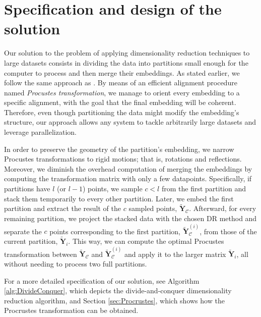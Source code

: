 \section{Specification and design of the solution}
\label{sec:specification-and-design-of-the-solution}

Our solution to the problem of applying dimensionality reduction techniques to large datasets consists in dividing the data into partitions small enough for the computer to process and then merge their embeddings. As stated earlier, we follow the same approach as \citet{Delicado2024}. By means of an efficient alignment procedure named \textit{Procustes transformation}, we manage to orient every embedding to a specific alignment, with the goal that the final embedding will be coherent. Therefore, even though partitioning the data might modify the embedding's structure, our approach allows any system to tackle arbitrarily large datasets and leverage parallelization.

In order to preserve the geometry of the partition's embedding, we narrow Procustes transformations to rigid motions; that is, rotations and reflections. Moreover, we diminish the overhead computation of merging the embeddings by computing the transformation matrix with only a few datapoints. Specifically, if partitions have $l$ (or $l-1$) points, we sample $c < l$ from the first partition and stack them temporarily to every other partition. Later, we embed the first partition and extract the result of the $c$ sampled points, $\mathbf{\tilde{Y}}_{\mathcal{C}}$. Afterward, for every remaining partition, we project the stacked data with the chosen DR method and separate the $c$ points corresponding to the first partition, $\mathbf{\tilde{Y}}_{\mathcal{C}}^{(i)}$, from those of the current partition, $\mathbf{\tilde{Y}}_{i}$. This way, we can compute the optimal Procustes transformation between $\mathbf{\tilde{Y}}_{\mathcal{C}}$ and $\mathbf{\tilde{Y}}_{\mathcal{C}}^{(i)}$ and apply it to the larger matrix $\mathbf{\tilde{Y}}_i$, all without needing to process two full partitions.

For a more detailed specification of our solution, see Algorithm \ref{alg:DivideConquer}, which depicts the divide-and-conquer dimensionality reduction algorithm, and Section \ref{sec:Procrustes}, which shows how the Procrustes transformation can be obtained.

